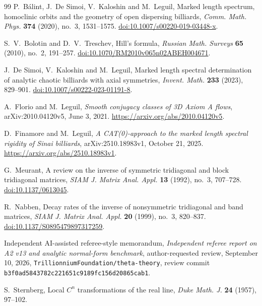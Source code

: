 \begin{thebibliography}{99}
P.~B\'alint, J.~De Simoi, V.~Kaloshin and M.~Leguil,
Marked length spectrum, homoclinic orbits and the geometry of open
dispersing billiards, \emph{Comm. Math. Phys.} \textbf{374} (2020),
no.~3, 1531--1575.
\href{https://doi.org/10.1007/s00220-019-03448-x}{doi:10.1007/s00220-019-03448-x}.

S.~V.~Bolotin and D.~V.~Treschev, Hill's formula,
\emph{Russian Math. Surveys} \textbf{65} (2010), no.~2, 191--257.
\href{https://doi.org/10.1070/RM2010v065n02ABEH004671}{doi:10.1070/RM2010v065n02ABEH004671}.

J.~De Simoi, V.~Kaloshin and M.~Leguil, Marked length spectral
determination of analytic chaotic billiards with axial symmetries,
\emph{Invent. Math.} \textbf{233} (2023), 829--901.
\href{https://doi.org/10.1007/s00222-023-01191-8}{doi:10.1007/s00222-023-01191-8}.

A.~Florio and M.~Leguil, \emph{Smooth conjugacy classes of 3D Axiom A
flows}, arXiv:2010.04120v5, June 3, 2021.
\url{https://arxiv.org/abs/2010.04120v5}.

D.~Finamore and M.~Leguil, \emph{A CAT(0)-approach to the marked
length spectral rigidity of Sinai billiards}, arXiv:2510.18983v1,
October 21, 2025. \url{https://arxiv.org/abs/2510.18983v1}.

G.~Meurant, A review on the inverse of symmetric tridiagonal and
block tridiagonal matrices, \emph{SIAM J. Matrix Anal. Appl.}
\textbf{13} (1992), no.~3, 707--728.
\href{https://doi.org/10.1137/0613045}{doi:10.1137/0613045}.

R.~Nabben, Decay rates of the inverse of nonsymmetric tridiagonal and
band matrices, \emph{SIAM J. Matrix Anal. Appl.} \textbf{20} (1999),
no.~3, 820--837.
\href{https://doi.org/10.1137/S0895479897317259}{doi:10.1137/S0895479897317259}.

Independent AI-assisted referee-style memorandum,
\emph{Independent referee report on A2 v13 and analytic normal-form
benchmark}, author-requested review, September 10, 2026,
\texttt{Trillionnium\allowbreak Foundation/\allowbreak theta-theory},
review commit \texttt{b3f0ad58\allowbreak 43782c22\allowbreak 1651c918\allowbreak 9fc156d2\allowbreak 0865cab1}.

S.~Sternberg, Local $C^n$ transformations of the real line,
\emph{Duke Math. J.} \textbf{24} (1957), 97--102.


\end{thebibliography}
